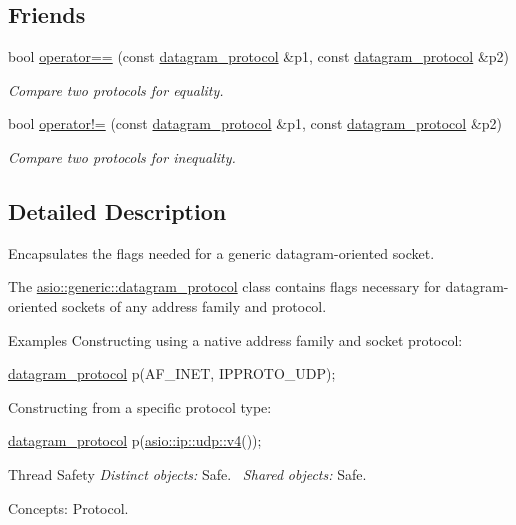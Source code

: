 \subsection*{Friends}
\begin{DoxyCompactItemize}
\item 
bool \hyperlink{classasio_1_1generic_1_1datagram__protocol_abfb68611c85364d735f6b3903222baff}{operator==} (const \hyperlink{classasio_1_1generic_1_1datagram__protocol}{datagram\+\_\+protocol} \&p1, const \hyperlink{classasio_1_1generic_1_1datagram__protocol}{datagram\+\_\+protocol} \&p2)
\begin{DoxyCompactList}\small\item\em Compare two protocols for equality. \end{DoxyCompactList}\item 
bool \hyperlink{classasio_1_1generic_1_1datagram__protocol_ac9657a3ac5a5a2192b56ad93b1d720a8}{operator!=} (const \hyperlink{classasio_1_1generic_1_1datagram__protocol}{datagram\+\_\+protocol} \&p1, const \hyperlink{classasio_1_1generic_1_1datagram__protocol}{datagram\+\_\+protocol} \&p2)
\begin{DoxyCompactList}\small\item\em Compare two protocols for inequality. \end{DoxyCompactList}\end{DoxyCompactItemize}


\subsection{Detailed Description}
Encapsulates the flags needed for a generic datagram-\/oriented socket. 

The \hyperlink{classasio_1_1generic_1_1datagram__protocol}{asio\+::generic\+::datagram\+\_\+protocol} class contains flags necessary for datagram-\/oriented sockets of any address family and protocol.

\begin{DoxyParagraph}{Examples}
Constructing using a native address family and socket protocol\+: 
\begin{DoxyCode}
\hyperlink{classasio_1_1generic_1_1datagram__protocol_aff9518b9e296409e4b1c8a7edb6483e2}{datagram\_protocol} p(AF\_INET, IPPROTO\_UDP); 
\end{DoxyCode}
 Constructing from a specific protocol type\+: 
\begin{DoxyCode}
\hyperlink{classasio_1_1generic_1_1datagram__protocol_aff9518b9e296409e4b1c8a7edb6483e2}{datagram\_protocol} p(\hyperlink{classasio_1_1ip_1_1udp_a59d5e1cf1796499a03e41afdf0275713}{asio::ip::udp::v4}()); 
\end{DoxyCode}

\end{DoxyParagraph}
\begin{DoxyParagraph}{Thread Safety}
{\itshape Distinct} {\itshape objects\+:} Safe.~\newline
{\itshape Shared} {\itshape objects\+:} Safe.
\end{DoxyParagraph}
\begin{DoxyParagraph}{Concepts\+:}
Protocol. 
\end{DoxyParagraph}


